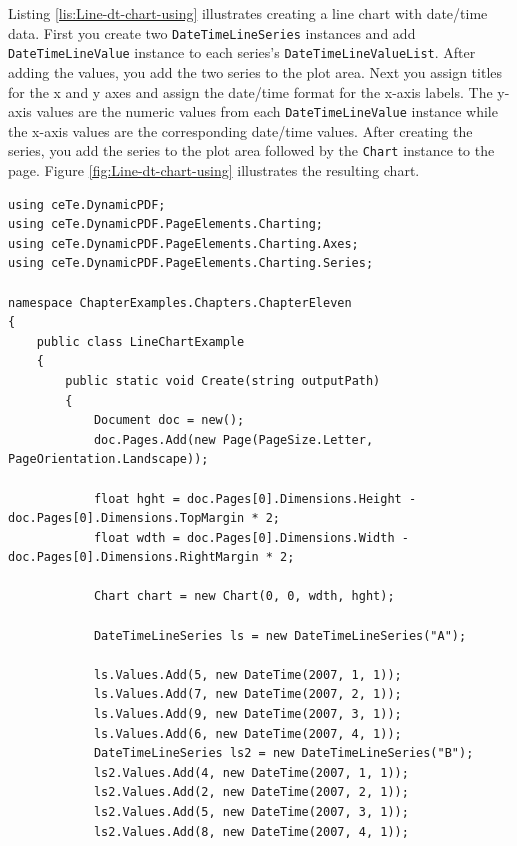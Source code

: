 \documentclass[american,letterpaper]{tufte-book}
\numberwithin{equation}{section}
\numberwithin{figure}{section}
\begin{document}
{Listing \ref{lis:Line-dt-chart-using} illustrates creating a line
chart with date/time data. First you create two \texttt{DateTimeLineSeries}
instances and add \texttt{DateTimeLineValue} instance to each series's
\texttt{DateTimeLineValueList}. After adding the values, you add the
two series to the plot area. Next you assign titles for the x and y
axes and assign the date/time format for the x-axis labels. The y-axis
values are the numeric values from each \texttt{DateTimeLineValue}
instance while the x-axis values are the corresponding date/time values.
After creating the series, you add the series to the plot area followed
by the \texttt{Chart} instance to the page. Figure \ref{fig:Line-dt-chart-using}
illustrates the resulting chart. 

\bgroup{}
\begin{lstlisting}[caption={Line chart using date/time data.},label={lis:Line-dt-chart-using},basicstyle={\small\ttfamily},breaklines=true]
using ceTe.DynamicPDF;
using ceTe.DynamicPDF.PageElements.Charting;
using ceTe.DynamicPDF.PageElements.Charting.Axes;
using ceTe.DynamicPDF.PageElements.Charting.Series;

namespace ChapterExamples.Chapters.ChapterEleven
{
    public class LineChartExample
    {
        public static void Create(string outputPath)
        {
            Document doc = new();
            doc.Pages.Add(new Page(PageSize.Letter, PageOrientation.Landscape));

            float hght = doc.Pages[0].Dimensions.Height - doc.Pages[0].Dimensions.TopMargin * 2;
            float wdth = doc.Pages[0].Dimensions.Width - doc.Pages[0].Dimensions.RightMargin * 2;

            Chart chart = new Chart(0, 0, wdth, hght);

            DateTimeLineSeries ls = new DateTimeLineSeries("A");

            ls.Values.Add(5, new DateTime(2007, 1, 1));
            ls.Values.Add(7, new DateTime(2007, 2, 1));
            ls.Values.Add(9, new DateTime(2007, 3, 1));
            ls.Values.Add(6, new DateTime(2007, 4, 1));
            DateTimeLineSeries ls2 = new DateTimeLineSeries("B");
            ls2.Values.Add(4, new DateTime(2007, 1, 1));
            ls2.Values.Add(2, new DateTime(2007, 2, 1));
            ls2.Values.Add(5, new DateTime(2007, 3, 1));
            ls2.Values.Add(8, new DateTime(2007, 4, 1));
           

\end{lstlisting}}
\end{document}
